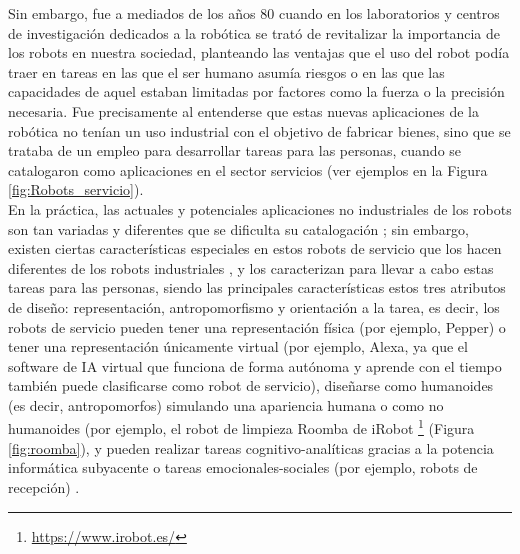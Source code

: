   \pagebreak
   
Sin embargo, fue a mediados de los años 80 cuando en los laboratorios y centros de investigación dedicados a la robótica se trató de revitalizar la importancia de los robots en nuestra sociedad, planteando las ventajas que el uso del robot podía traer en tareas en las que el ser humano asumía riesgos o en las que las capacidades de aquel estaban limitadas por factores como la fuerza o la precisión necesaria. Fue precisamente al entenderse que estas nuevas aplicaciones de la robótica no tenían un uso industrial con el objetivo de fabricar bienes, sino que se trataba de un empleo para desarrollar tareas para las personas, cuando se catalogaron como aplicaciones en el sector servicios \cite{Barrientos02}(ver ejemplos en la Figura \ref{fig:Robots_servicio}).\\

En la práctica, las actuales y potenciales aplicaciones no industriales de los robots son tan variadas y diferentes que se dificulta su catalogación \cite{Barrientos02}; sin embargo, existen ciertas características especiales en estos robots de servicio que los hacen diferentes de los robots industriales \cite{Aracil08}, y los caracterizan para llevar a cabo estas tareas para las personas, siendo las principales características estos tres atributos de diseño: representación, antropomorfismo y orientación a la tarea, es decir, los robots de servicio pueden tener una representación física (por ejemplo, Pepper) o tener una representación únicamente virtual (por ejemplo, Alexa, ya que el software de IA virtual que funciona de forma autónoma y aprende con el tiempo también puede clasificarse como robot de servicio), diseñarse como humanoides (es decir, antropomorfos) simulando una apariencia humana o como no humanoides (por ejemplo, el robot de limpieza Roomba de iRobot \footnote{\url{https://www.irobot.es/}} (Figura \ref{fig:roomba}), y pueden realizar tareas cognitivo-analíticas gracias a la potencia informática subyacente o tareas emocionales-sociales (por ejemplo, robots de recepción) \cite{Wirtz18}.\\

